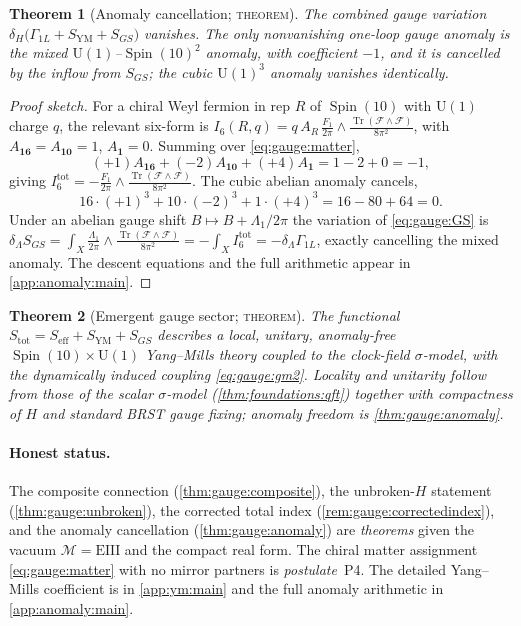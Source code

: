 \documentclass[11pt]{article}
\theoremstyle{plain}
\newtheorem{theorem}{Theorem}[section]
\theoremstyle{definition}
\theoremstyle{remark}
\newcommand{\U}[1]{\mathrm{U}(#1)}
\newcommand{\Spin}{\operatorname{Spin}}
\newcommand{\Tr}{\operatorname{Tr}}
\newcommand{\Uone}{\U{1}}
\begin{document}
\begin{theorem}[Anomaly cancellation; \textsc{theorem}]\label{thm:gauge:anomaly}
The combined gauge variation
$\delta_H\bigl(\Gamma_{1L}+S_{\text{YM}}+S_{GS}\bigr)$ vanishes. The only
nonvanishing one-loop gauge anomaly is the mixed $\Uone$--$\Spin(10)^{2}$
anomaly, with coefficient $-1$, and it is cancelled by the inflow from
$S_{GS}$; the cubic $\Uone^{3}$ anomaly vanishes identically.
\end{theorem}

\begin{proof}[Proof sketch]
For a chiral Weyl fermion in rep $R$ of $\Spin(10)$ with $\Uone$ charge
$q$, the relevant six-form is
$I_6(R,q)=q\,A_R\,\frac{F_1}{2\pi}\wedge\frac{\Tr(\mathcal F\wedge\mathcal F)}{8\pi^2}$,
with $A_{\mathbf{16}}=A_{\mathbf{10}}=1$, $A_{\mathbf 1}=0$. Summing over
\eqref{eq:gauge:matter},
\begin{equation}\label{eq:gauge:mixed}
  (+1)A_{\mathbf{16}}+(-2)A_{\mathbf{10}}+(+4)A_{\mathbf 1}
  = 1-2+0 = -1,
\end{equation}
giving $I_6^{\text{tot}}=-\frac{F_1}{2\pi}\wedge\frac{\Tr(\mathcal F\wedge\mathcal F)}{8\pi^2}$.
The cubic abelian anomaly cancels,
\begin{equation}\label{eq:gauge:cubic}
  16\cdot(+1)^{3}+10\cdot(-2)^{3}+1\cdot(+4)^{3}
  = 16 - 80 + 64 = 0.
\end{equation}
Under an abelian gauge shift $B\mapsto B+\Lambda_1/2\pi$ the variation of
\eqref{eq:gauge:GS} is
$\delta_\Lambda S_{GS}=\int_X\frac{\Lambda_1}{2\pi}\wedge\frac{\Tr(\mathcal F\wedge\mathcal F)}{8\pi^2}=-\int_X I_6^{\text{tot}}=-\delta_\Lambda\Gamma_{1L}$,
exactly cancelling the mixed anomaly. The descent equations and the full
arithmetic appear in \autoref{app:anomaly:main}.
\end{proof}

\begin{theorem}[Emergent gauge sector; \textsc{theorem}]\label{thm:gauge:sector}
The functional $S_{\text{tot}}=S_{\text{eff}}+S_{\text{YM}}+S_{GS}$
describes a local, unitary, anomaly-free $\Spin(10)\times\Uone$
Yang--Mills theory coupled to the clock-field $\sigma$-model, with the
dynamically induced coupling \eqref{eq:gauge:gm2}. Locality and unitarity
follow from those of the scalar $\sigma$-model (\autoref{thm:foundations:qft})
together with compactness of $H$ and standard BRST gauge fixing; anomaly
freedom is \autoref{thm:gauge:anomaly}.
\end{theorem}

\paragraph{Honest status.} The composite connection
(\autoref{thm:gauge:composite}), the unbroken-$H$ statement
(\autoref{thm:gauge:unbroken}), the corrected total index
(\autoref{rem:gauge:correctedindex}), and the anomaly cancellation
(\autoref{thm:gauge:anomaly}) are \emph{theorems} given the vacuum
$\mathcal M=\mathrm{EIII}$ and the compact real form. The chiral matter
assignment \eqref{eq:gauge:matter} with no mirror partners is
\emph{postulate}~P4. The detailed Yang--Mills coefficient is in
\autoref{app:ym:main} and the full anomaly arithmetic in
\autoref{app:anomaly:main}.
\end{document}
